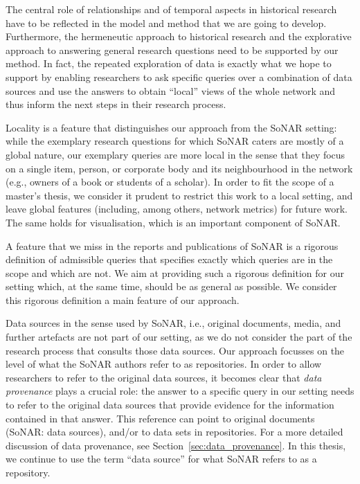 The central role of relationships and of temporal aspects in historical research
have to be reflected in the model and method that we are going to develop.
Furthermore, the hermeneutic approach to historical research
and the explorative approach to answering general research questions 
need to be supported by our method. In fact, the repeated exploration of data
is exactly what we hope to support by enabling researchers to ask specific
queries over a combination of data sources and use the answers to obtain
\enquote{local} views of the whole network and thus inform the next steps in their research process.

Locality is a feature that distinguishes our approach from the SoNAR setting:
while the exemplary research questions for which SoNAR caters are mostly of a global nature,
our exemplary queries are more local in the sense that they focus on
a single item, person, or corporate body and its neighbourhood in the network
(e.g., owners of a book or students of a scholar). 
In order to fit the scope of a master's thesis,
we consider it prudent to restrict this work to a local setting,
and leave global features (including, among others, network metrics)
for future work. The same holds for visualisation, which is an important component
of SoNAR.

A feature that we miss in the reports and publications of SoNAR is a rigorous definition of admissible queries
that specifies exactly which queries are in the scope and which are not.
We aim at providing such a rigorous definition for our setting
which, at the same time, should be as general as possible. We consider this rigorous definition
a main feature of our approach.

Data sources in the sense used by SoNAR, i.e., original documents, media, and further artefacts
are not part of our setting, as we do not consider the part of the research process
that consults those data sources. Our approach focusses on the level of
what the SoNAR authors refer to as repositories.
In order to allow researchers to refer to the original data sources,
it becomes clear that \emph{data provenance} plays a crucial role:
the answer to a specific query in our setting needs to refer to
the original data sources that provide evidence for the information contained in that answer.
This reference can point to original documents (SoNAR: data sources),
and/or to data sets in repositories. For a more detailed discussion of data provenance,
see Section~\ref{sec:data_provenance}.
In this thesis, we continue to use the term \enquote{data source} for what
SoNAR refers to as a repository.


